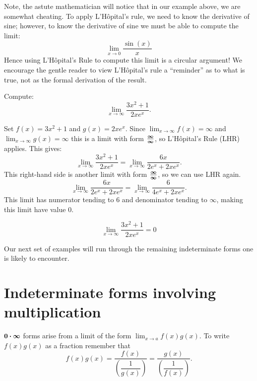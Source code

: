 \documentclass{ximera}
\begin{document}
\begin{remark}
  Note, the astute mathematician will notice that in our example
  above, we are somewhat cheating. To apply L'H\^ opital's rule, we
  need to know the derivative of sine; however, to know the derivative
  of sine we must be able to compute the limit:
  \[  \lim_{x\to 0}\frac{\sin(x)}{x} \]
  Hence using L'H\^{o}pital's Rule to compute this limit is a circular
  argument! We encourage the gentle reader to view L'H\^{o}pital's rule
  a ``reminder'' as to what is true, not as the formal derivation of
  the result.
\end{remark}

\begin{example}
	Compute:
	\[ \lim_{x\to \infty} \dfrac{3x^2 + 1}{2xe^x}.\]

	\begin{explanation}
		Set $f(x) =3x^2+1$ and $g(x)=2xe^x$. 
		Since $\displaystyle \lim_{x\to \infty}f(x) = \infty$ and $\displaystyle \lim_{x\to \infty} g(x) = \infty$
		this is a limit with form $\boldsymbol{\tfrac{\infty}{\infty}}$, so L'H\^{o}pital's Rule (LHR) applies. This gives:
		\[ \lim_{x\to \infty} \dfrac{3x^2 + 1}{2xe^x} = \lim_{x\to \infty}\dfrac{6x}{2e^x + 2xe^x}. \]
		This right-hand side is another limit with form $\boldsymbol{\tfrac{\infty}{\infty}}$, so we can use LHR again.
		\[ \lim_{x\to \infty}\dfrac{6x}{2e^x + 2xe^x} = \lim_{x\to \infty}\dfrac{6}{4e^x + 2xe^x}. \]
		This limit has numerator tending to $6$ and denominator tending to $\infty$, making this limit have value $0$.
		
		\[ \lim_{x\to \infty}\dfrac{3x^2+1}{2xe^x} = 0\]
	\end{explanation}
\end{example}



Our next set of examples will run through the remaining indeterminate
forms one is likely to encounter.
\section{Indeterminate forms involving multiplication}

$\small\boldsymbol{0\cdot \infty}$ forms arise from a limit of the form $\displaystyle \lim_{x\to a}f(x)g(x)$. To write $f(x)g(x)$ as a fraction remember that
\[ f(x)g(x) = \dfrac{f(x)}{\left(\dfrac{1}{g(x)}\right)} = \dfrac{g(x)}{\left(\dfrac{1}{f(x)}\right)}. \]
\end{document}

